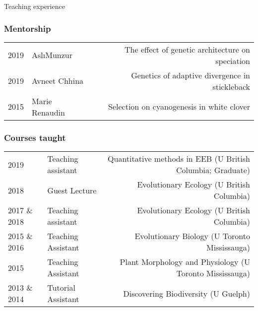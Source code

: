 \documentclass[11pt]{article}
\let\tikzi=\i %
\begin{document}


\noindent
\begin{rSection}{Teaching experience} %

\noindent
\subsubsection*{Mentorship}

\begin{tabular}{llr}


2019 & Asl\tikzi \space Munzur & The effect of genetic architecture on speciation\\
2019 & Avneet Chhina & Genetics of adaptive divergence in stickleback\\
2015 & Marie Renaudin & Selection on cyanogenesis in white clover
\end{tabular}

\subsubsection*{Courses taught}
\indent
\begin{tabular}{llr}

2019 & Teaching assistant & Quantitative methods in EEB (U British Columbia; Graduate)\\  %
2018 & Guest Lecture & Evolutionary Ecology (U British Columbia)\\ %
2017 \& 2018 & Teaching assistant & Evolutionary Ecology (U British Columbia)\\ %
2015 \& 2016 & Teaching Assistant & Evolutionary Biology (U Toronto Mississauga)\\ %
2015 & Teaching Assistant & Plant Morphology and Physiology (U Toronto Mississauga)\\ %
2013 \& 2014 & Tutorial Assistant & Discovering Biodiversity (U Guelph) %
\end{tabular}

\end{rSection}

\begin{tabular}{llr}


\end{tabular}
\end{document}
